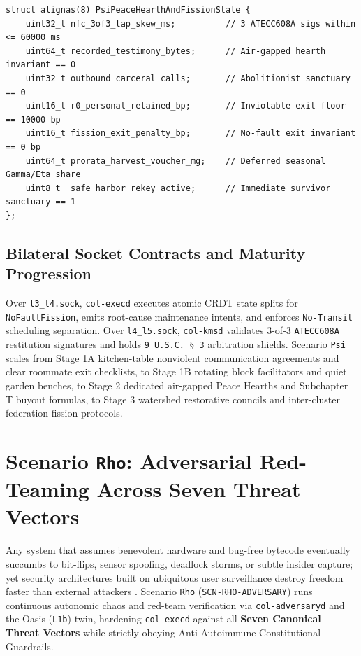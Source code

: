 \begin{lstlisting}[caption={Scenario \texttt{Psi} Air-Gapped Peace Hearth 3-of-3 NFC Seal and No-Fault Fission Structs},label={lst:psi-structs}]
struct alignas(8) PsiPeaceHearthAndFissionState {
    uint32_t nfc_3of3_tap_skew_ms;          // 3 ATECC608A sigs within <= 60000 ms
    uint64_t recorded_testimony_bytes;      // Air-gapped hearth invariant == 0
    uint32_t outbound_carceral_calls;       // Abolitionist sanctuary == 0
    uint16_t r0_personal_retained_bp;       // Inviolable exit floor == 10000 bp
    uint16_t fission_exit_penalty_bp;       // No-fault exit invariant == 0 bp
    uint64_t prorata_harvest_voucher_mg;    // Deferred seasonal Gamma/Eta share
    uint8_t  safe_harbor_rekey_active;      // Immediate survivor sanctuary == 1
};
\end{lstlisting}

\subsection{Bilateral Socket Contracts and Maturity Progression}

Over \texttt{l3\_l4.sock}, \texttt{col-execd} executes atomic CRDT state splits for \texttt{NoFaultFission}, emits root-cause maintenance intents, and
enforces \texttt{No-Transit} scheduling separation. Over \texttt{l4\_l5.sock}, \texttt{col-kmsd} validates 3-of-3 \texttt{ATECC608A} restitution
signatures and holds \texttt{9 U.S.C.\ \S~3} arbitration shields. Scenario \texttt{Psi} scales from Stage 1A kitchen-table nonviolent communication
agreements and clear roommate exit checklists, to Stage 1B rotating block facilitators and quiet garden benches, to Stage 2 dedicated air-gapped Peace
Hearths and Subchapter T buyout formulas, to Stage 3 watershed restorative councils and inter-cluster federation fission protocols.

\section{Scenario \texttt{Rho}: Adversarial Red-Teaming Across Seven Threat Vectors}
\label{sec:scn-rho}

Any system that assumes benevolent hardware and bug-free bytecode eventually succumbs to bit-flips, sensor spoofing, deadlock storms, or subtle insider
capture; yet security architectures built on ubiquitous user surveillance destroy freedom faster than external attackers
\parencite{saltzer1984end,rose2020zero}. Scenario \texttt{Rho} (\texttt{SCN-RHO-ADVERSARY}) runs continuous autonomic chaos and red-team verification
via \texttt{col-adversaryd} and the Oasis (\texttt{L1b}) twin, hardening \texttt{col-execd} against all \textbf{Seven Canonical Threat Vectors} while
strictly obeying Anti-Autoimmune Constitutional Guardrails.

